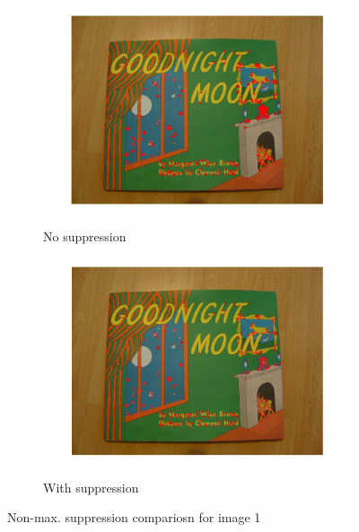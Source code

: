 \documentclass[paper=a4, fontsize=11pt]{scrartcl} %
\numberwithin{equation}{section} %
\numberwithin{figure}{section} %
\numberwithin{table}{section} %
\begin{document}
\begin{figure}
\centering
\begin{subfigure}{.5\textwidth}
  \centering
  \includegraphics[width=1\linewidth]{img1_harris_no_supr.jpg}
  \caption{No suppression}
\end{subfigure}%
\begin{subfigure}{.5\textwidth}
  \centering
  \includegraphics[width=1\linewidth]{im1_harris_corners.jpg}
  \caption{With suppression}
\end{subfigure}
\caption{Non-max. suppression compariosn for image 1}
\label{fig:supr1}
\end{figure}
\end{document}
